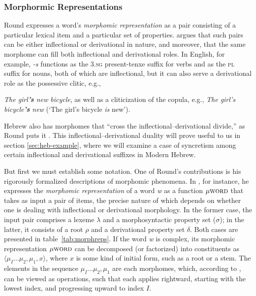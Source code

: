 \subsubsection{Morphormic Representations}
Round expresses a word's \emph{morphomic representation} as a pair 
consisting of a particular lexical item and a particular set of properties.
\cite{round:2011} argues that such pairs can be either inflectional 
 or derivational in nature, and moreover, that the same morphome can fill 
 both inflectional and derivational roles. In English, for example, \emph{-s} 
functions as the \textsc{3.sg} present-tenxe suffix for verbs and as the \textsc{pl} 
 suffix for nouns, both of which are inflectional, but it can also serve a derivational 
 role as the possessive clitic, e.g.,
 {\emph{The girl\textbf{'s} new bicycle}, as well as a
 cliticization of the copula, e.g., \emph{The girl's bicycle\textbf{'s} new} (`The girl's bicycle \emph{is} new').

 Hebrew also has morphomes that ``cross the inflectional--derivational divide,'' 
 as Round puts it \citep[][p.14]{round:2015}. This inflectional--derivational 
 duality will prove useful to us in section \ref{sec:heb-example}, where we will 
 examine a case of syncretism among certain inflectional and derivational suffixes in Modern Hebrew.
  
  But first we must establish some notation. 
  One of Round's contributions is his rigorously formalized descriptions of 
  morphomic phenomena. In \citet{round:2011}, for instance, 
  he expresses the \emph{morphomic representation} of a word 
  \textit{w} as a function $\mu{\textsc{word}}$ that 
  takes as input a pair of items, the precise nature
  of which depends on whether one is dealing with inflectional or 
  derivational morphology. In the former case, the input pair comprises 
  a lexeme $\lambda$ and a morphosyntactic property set ($\sigma$); in the latter, 
  it consists of a root $\rho$ and a derivational property set $\delta$. 
  Both cases are presented in table~\ref{tab:morphreps}. If the word \textit{w} 
 is complex, its morphomic representation $\mu{\textsc{word}}$ 
  can be decomposed (or factorized) into constituents as  
  $\langle  \mu_{I} \dots \mu_{2}, \mu_{1}, x \rangle$, where $x$ 
  is some kind of initial form, such as a root or a stem. The elements in the sequence 
  $ \mu_{I} \dots \mu_{2}, \mu_{1}$ are each morphomes, 
  which, according to \citet{round:2015}, can be viewed as operations, 
  such that each applies rightward, starting with the lowest index, and progressing upward
  to index $I$.
  
}
